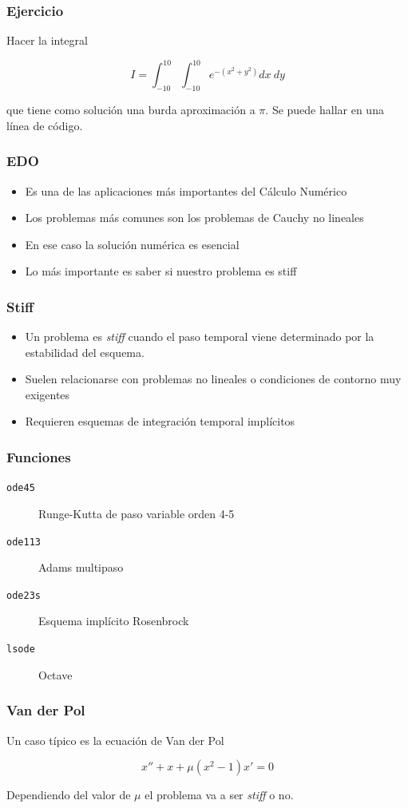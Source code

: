 \documentclass[12pt]{beamer}
\begin{document}
\begin{frame}
  \frametitle{Ejercicio}
  Hacer la integral

  \[ I=\int_{-10}^{10}\int_{-10}^{10}e^{-(x^2+y^2)}dx\ dy \]
  
  que tiene como solución una burda aproximación a $\pi$.  Se puede
  hallar en una línea de código.
\end{frame}

\begin{frame}
\frametitle{EDO}
\begin{itemize}
\item Es una de las aplicaciones más importantes del Cálculo Numérico
\item Los problemas más comunes son los problemas de Cauchy no lineales
\item En ese caso la solución numérica es esencial
\item Lo más importante es saber si nuestro problema es stiff
\end{itemize}
\end{frame}

\begin{frame}
\frametitle{Stiff}
\begin{itemize}
\item Un problema es \emph{stiff} cuando el paso temporal viene
  determinado por la estabilidad del esquema.
\item Suelen relacionarse con problemas no lineales o condiciones de
  contorno muy exigentes
\item Requieren esquemas de integración temporal implícitos
\end{itemize}
\end{frame}

\begin{frame}
  \frametitle{Funciones}
  \begin{description}
  \item[\texttt{ode45}] Runge-Kutta de paso variable orden 4-5
  \item[\texttt{ode113}] Adams multipaso
  \item[\texttt{ode23s}] Esquema implícito Rosenbrock
  \item[\texttt{lsode}] Octave
  \end{description}
\end{frame}

\begin{frame}
  \frametitle{Van der Pol}
Un caso típico es la ecuación de Van der Pol

\[ x'' + x +\mu(x^2-1)x' = 0 \]

Dependiendo del valor de $\mu$ el problema va a ser \emph{stiff} o no.
\end{frame}
\end{document}
